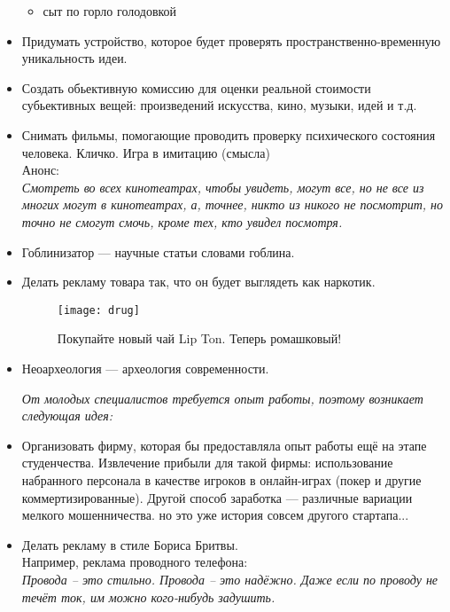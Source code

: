 \begin{itemize}
\begin{itemize}
            \item сыт по горло голодовкой
        \end{itemize}
    \item Придумать устройство, которое будет проверять пространственно-временную уникальность идеи.
    \item Создать обьективную комиссию для оценки реальной стоимости субьективных вещей: произведений искусства, кино, музыки, идей и т.д.
    \item Снимать фильмы, помогающие проводить проверку психического состояния человека.
    Кличко. Игра в имитацию (смысла) \\
    Анонс:\\
    \emph{Смотреть во всех кинотеатрах, чтобы увидеть, могут все, но не все из многих могут в кинотеатрах, а, точнее, никто из никого не посмотрит, но точно не смогут смочь, кроме тех, кто увидел посмотря.}
    \item Гоблинизатор --- научные статьи словами гоблина.
    \item Делать рекламу товара так, что он будет выглядеть как наркотик.

    \begin{figure}[ht!]
        \centering
        \texttt{[image: drug]}
        \caption{Покупайте новый чай Lip Ton. Теперь ромашковый!}
    \end{figure}
    
    \item Неоархеология --- археология современности.
    
    \emph{От молодых специалистов требуется опыт работы, поэтому возникает следующая идея:}
    \item Организовать фирму, которая бы предоставляла опыт работы ещё на этапе студенчества. Извлечение прибыли для такой фирмы: использование набранного персонала в качестве игроков в онлайн-играх (покер и другие коммертизированные). Другой способ заработка --- различные вариации мелкого мошенничества. но это уже история совсем другого стартапа... 
    \item Делать рекламу в стиле Бориса Бритвы. \\
    Например, реклама проводного телефона: \\
    \emph{Провода -- это стильно. Провода -- это надёжно. Даже если по проводу не течёт ток, им можно кого-нибудь задушить.}
\end{itemize}

